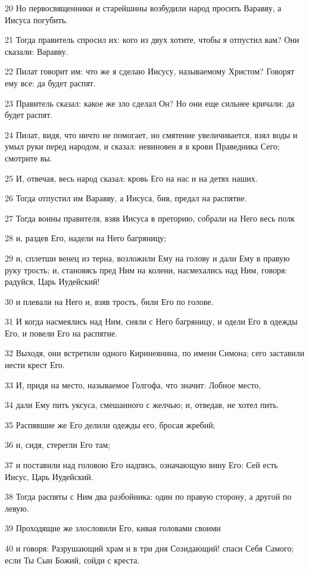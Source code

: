 \par 20 Но первосвященники и старейшины возбудили народ просить Варавву, а Иисуса погубить.
\par 21 Тогда правитель спросил их: кого из двух хотите, чтобы я отпустил вам? Они сказали: Варавву.
\par 22 Пилат говорит им: что же я сделаю Иисусу, называемому Христом? Говорят ему все: да будет распят.
\par 23 Правитель сказал: какое же зло сделал Он? Но они еще сильнее кричали: да будет распят.
\par 24 Пилат, видя, что ничто не помогает, но смятение увеличивается, взял воды и умыл руки перед народом, и сказал: невиновен я в крови Праведника Сего; смотрите вы.
\par 25 И, отвечая, весь народ сказал: кровь Его на нас и на детях наших.
\par 26 Тогда отпустил им Варавву, а Иисуса, бив, предал на распятие.
\par 27 Тогда воины правителя, взяв Иисуса в преторию, собрали на Него весь полк
\par 28 и, раздев Его, надели на Него багряницу;
\par 29 и, сплетши венец из терна, возложили Ему на голову и дали Ему в правую руку трость; и, становясь пред Ним на колени, насмехались над Ним, говоря: радуйся, Царь Иудейский!
\par 30 и плевали на Него и, взяв трость, били Его по голове.
\par 31 И когда насмеялись над Ним, сняли с Него багряницу, и одели Его в одежды Его, и повели Его на распятие.
\par 32 Выходя, они встретили одного Киринеянина, по имени Симона; сего заставили нести крест Его.
\par 33 И, придя на место, называемое Голгофа, что значит: Лобное место,
\par 34 дали Ему пить уксуса, смешанного с желчью; и, отведав, не хотел пить.
\par 35 Распявшие же Его делили одежды его, бросая жребий;
\par 36 и, сидя, стерегли Его там;
\par 37 и поставили над головою Его надпись, означающую вину Его: Сей есть Иисус, Царь Иудейский.
\par 38 Тогда распяты с Ним два разбойника: один по правую сторону, а другой по левую.
\par 39 Проходящие же злословили Его, кивая головами своими
\par 40 и говоря: Разрушающий храм и в три дня Созидающий! спаси Себя Самого; если Ты Сын Божий, сойди с креста.
